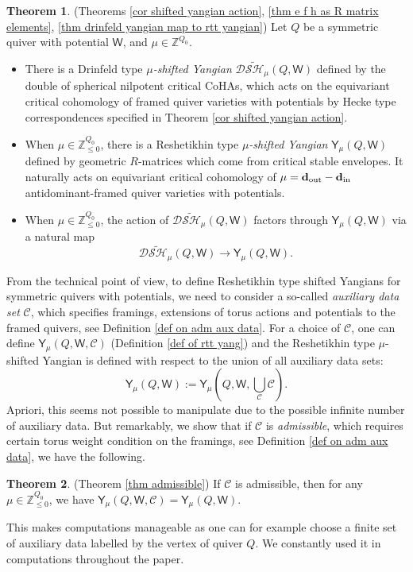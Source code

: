 \documentclass[10pt]{amsart}
\theoremstyle{definition}
\newtheorem{Theorem}{Theorem}[section]
\numberwithin{equation}{section}
\newcommand{\bZ}{\mathbb{Z}}
\newcommand{\sW}{\mathsf{W}}
\begin{document}
\begin{Theorem}(Theorems \ref{cor shifted yangian action}, \ref{thm e f h as R matrix elements}, \ref{thm drinfeld yangian map to rtt yangian})
Let $Q$ be a symmetric quiver with potential $\sW$, and $\mu\in \bZ^{Q_0}$.  
\begin{itemize}
    \item There is a Drinfeld type $\mu$\textit{-shifted Yangian} $\mathcal D\widetilde{\mathcal{SH}}_\mu(Q,\sW)$ defined by the double of spherical nilpotent critical CoHAs, which acts on the equivariant critical cohomology of framed quiver varieties with potentials by Hecke type correspondences specified in Theorem \ref{cor shifted yangian action}. 
\item When $\mu\in \bZ_{\leqslant 0}^{Q_0}$, there is a Reshetikhin type $\mu$\textit{-shifted Yangian} $\mathsf Y_\mu(Q,\sW)$ defined by geometric $R$-matrices
which come from critical stable envelopes. It naturally acts on equivariant critical cohomology of  
$\mu =\mathbf{d}_\textup{out} - \mathbf{d}_\textup{in}$ antidominant-framed quiver varieties with potentials. 
\item When $\mu\in \bZ_{\leqslant 0}^{Q_0}$, the action of $\mathcal D\widetilde{\mathcal{SH}}_\mu(Q,\sW)$ factors through $\mathsf Y_\mu(Q,\sW)$ via a natural map 
$$\mathcal D\widetilde{\mathcal{SH}}_\mu(Q,\sW)\to \mathsf Y_\mu(Q,\sW). $$ 
\end{itemize}
\end{Theorem}
From the technical point of view, to define Reshetikhin type shifted Yangians for symmetric quivers with potentials, we need to consider a so-called 
\textit{auxiliary data set} $\mathcal C$, which specifies framings, extensions of torus actions and potentials to the framed quivers, see Definition \ref{def on adm aux data}. For a choice of $\mathcal C$, one can define $\mathsf Y_\mu(Q,\sW,\mathcal C)$
(Definition \ref{def of rtt yang}) and the Reshetikhin type $\mu$-shifted Yangian is defined with respect to the union of all auxiliary data sets: 
$$\mathsf Y_\mu(Q,\sW):=\mathsf Y_\mu(Q,\sW,\bigcup_{\mathcal C}\mathcal C).$$
Apriori, this seems not possible to manipulate due to the possible infinite number of auxiliary data. But remarkably, we show that 
if $\mathcal C$ is \textit{admissible}, which requires certain torus weight condition on the framings, see Definition \ref{def on adm aux data}, we have 
the following.
\begin{Theorem}(Theorem \ref{thm admissible})
If $\mathcal C$ is admissible, then for any $\mu\in \bZ_{\leqslant 0}^{Q_0}$, we have $\mathsf Y_\mu(Q,\sW,\mathcal C)=\mathsf Y_\mu(Q,\sW)$.
\end{Theorem}
This makes computations manageable as one can for example choose a finite set of auxiliary data labelled by the vertex of quiver $Q$.
We constantly used it in computations throughout the paper. 
\end{document}
